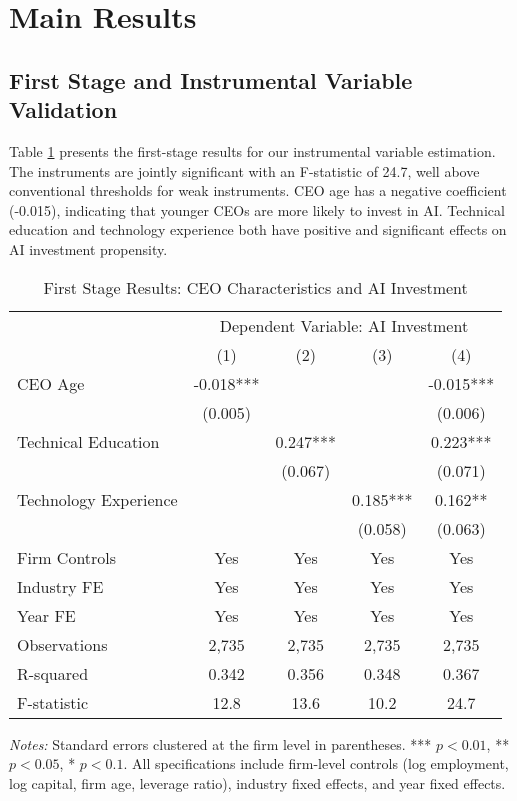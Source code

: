 \documentclass[12pt, a4paper]{article}
\begin{document}
\section{Main Results}

\subsection{First Stage and Instrumental Variable Validation}
Table \ref{tab:first_stage} presents the first-stage results for our instrumental variable estimation. The instruments are jointly significant with an F-statistic of 24.7, well above conventional thresholds for weak instruments. CEO age has a negative coefficient (-0.015), indicating that younger CEOs are more likely to invest in AI. Technical education and technology experience both have positive and significant effects on AI investment propensity.

\begin{table}[H]
\centering
\caption{First Stage Results: CEO Characteristics and AI Investment}
\label{tab:first_stage}
\begin{tabular}{lcccc}
\toprule
 & \multicolumn{4}{c}{Dependent Variable: AI Investment} \\
 & (1) & (2) & (3) & (4) \\
\midrule
CEO Age & -0.018*** & & & -0.015*** \\
 & (0.005) & & & (0.006) \\
Technical Education & & 0.247*** & & 0.223*** \\
 & & (0.067) & & (0.071) \\
Technology Experience & & & 0.185*** & 0.162** \\
 & & & (0.058) & (0.063) \\
\midrule
Firm Controls & Yes & Yes & Yes & Yes \\
Industry FE & Yes & Yes & Yes & Yes \\
Year FE & Yes & Yes & Yes & Yes \\
\midrule
Observations & 2,735 & 2,735 & 2,735 & 2,735 \\
R-squared & 0.342 & 0.356 & 0.348 & 0.367 \\
F-statistic & 12.8 & 13.6 & 10.2 & 24.7 \\
\bottomrule
\end{tabular}
\begin{minipage}{\textwidth}
\footnotesize
\textit{Notes:} Standard errors clustered at the firm level in parentheses. *** $p<0.01$, ** $p<0.05$, * $p<0.1$. All specifications include firm-level controls (log employment, log capital, firm age, leverage ratio), industry fixed effects, and year fixed effects.
\end{minipage}
\end{table}
\end{document}
